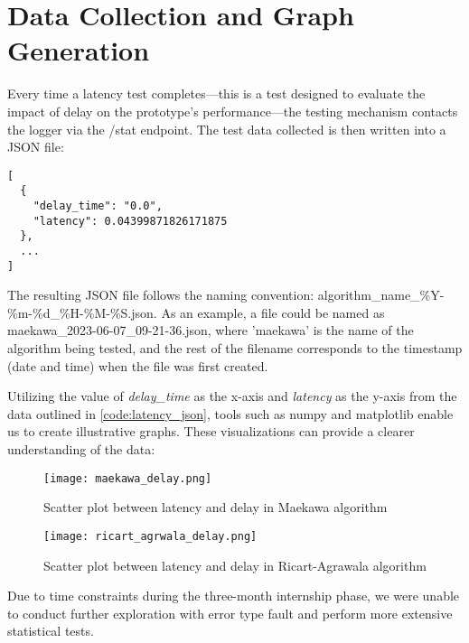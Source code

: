 \section{Data Collection and Graph Generation}

Every time a latency test completes—this is a test designed to evaluate the impact 
of delay on the prototype's performance—the testing mechanism contacts the logger 
via the /stat endpoint. The test data collected is then written into a JSON file:
  
\begin{listing}[H]
  \begin{verbatim}
[
  {
    "delay_time": "0.0",
    "latency": 0.04399871826171875
  },
  ...
]
  \end{verbatim}
  \caption{Latency data obtain from the logger}
  \label{code:latency_json}
\end{listing}

The resulting JSON file follows the naming convention: algorithm\_name\_\%Y-\%m-\%d\_\%H-\%M-\%S.json. As an example, a file could be named as maekawa\_2023-06-07\_09-21-36.json, where 'maekawa' is the name of the algorithm being tested, and the rest of the filename corresponds to the timestamp (date and time) when the file was first created.

Utilizing the value of \textit{delay\_time} as the x-axis and \textit{latency} 
as the y-axis from the data outlined in \ref{code:latency_json}, tools such as 
numpy and matplotlib enable us to create illustrative graphs. These visualizations can provide a clearer understanding of the data:

\begin{figure}[H]
  \centering
  \texttt{[image: maekawa\_delay.png]}
  \caption{Scatter plot between latency and delay in Maekawa algorithm}
\end{figure}

\begin{figure}[H]
  \centering
  \texttt{[image: ricart\_agrwala\_delay.png]}
  \caption{Scatter plot between latency and delay in Ricart-Agrawala algorithm}
\end{figure}

Due to time constraints during the three-month internship phase, we were unable 
to conduct further exploration with error type fault and perform more extensive statistical tests.
